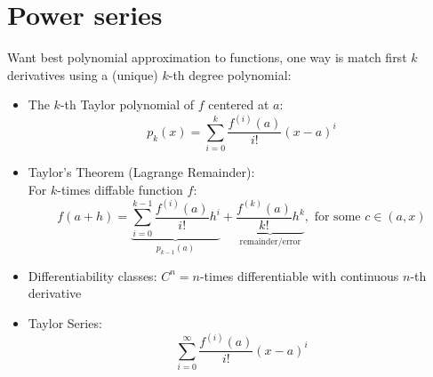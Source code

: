 \section{Power series}
Want best polynomial approximation to functions, one way is match first $k$ derivatives using a (unique) $k$-th degree polynomial:
\begin{itemize}
      \item The $k$-th Taylor polynomial of $f$ centered at $a$:
            \[p_k(x) = \sum_{i=0}^{k}\frac{f^{(i)}(a)}{i!} (x-a)^i\]
      \item Taylor's Theorem (Lagrange Remainder): \\
            For $k$-times diffable function $f$: \[f(a+h) = \underbrace{\sum_{i=0}^{k-1} \frac{f^{(i)}(a)}{i!}h^i}_{p_{k-1}(a)} + \underbrace{\frac{f^{(k)}(a)}{k!}h^k}_{\text{remainder/error}}, \text{ for some } c \in (a,x)\]
      \item Differentiability classes: $C^n = n$-times differentiable with continuous $n$-th derivative
      \item Taylor Series: \[\sum_{i=0}^{\infty}\frac{f^{(i)}(a)}{i!} (x-a)^i\]
\end{itemize}

